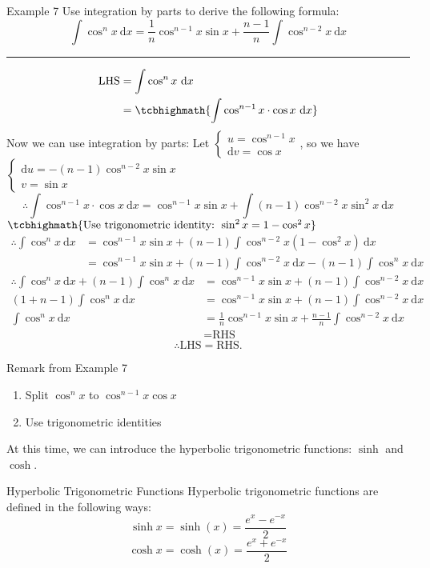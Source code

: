 \documentclass[12pt,a4paper]{article}
\def\d{{\mathrm{d}}}
\begin{document}
\begin{eg}{Example 7}
	Use integration by parts to derive the following formula: 
	$$\int\cos^nx\ \d x=\frac{1}{n}\cos^{n-1}x\sin{x}+\frac{n-1}{n}\int\cos^{n-2}x\ \d x$$
	\noindent\rule[0.25\baselineskip]{\textwidth}{1pt}
	$$\begin{aligned}
		\text{LHS}&=\int\cos^n x\ \d x\\
		&=\tcbhighmath{\int\cos^{n-1}x\cdot\cos x\ \d x}
	\end{aligned}$$
	Now we can use integration by parts: Let $\begin{cases}u=\cos^{n-1}x\\\d v=\cos x\end{cases}$, so we have $\begin{cases}\d u=-(n-1)\cos^{n-2}x\sin{x}\\v=\sin{x}\end{cases}$
	$$\therefore\int\cos^{n-1}x\cdot\cos{x}\ \d x=\cos^{n-1}x\sin{x}+\int(n-1)\cos^{n-2}x\sin^{2}x\ \d x$$
	$\tcbhighmath{\text{Use trigonometric identity: }\sin^2x=1-\cos^2x}$
	$$\begin{aligned}
		\therefore \boxed{\int\cos^n x\ \d x}&=\cos^{n-1}x\sin{x}+(n-1)\int\cos^{n-2}x(1-\cos^2x)\ \d x\\
		&=\cos^{n-1}x\sin{x}+(n-1)\int\cos^{n-2}x\ \d x-\boxed{(n-1)\int\cos^n x\ \d x}
	\end{aligned}$$
	$$\begin{aligned}
		\therefore\int\cos^n x\ \d x+(n-1)\int\cos^n x\ \d x&=\cos^{n-1}x\sin{x}+(n-1)\int\cos^{n-2}x\ \d x\\
		(1+n-1)\int\cos^n x\ \d x&=\cos^{n-1}x\sin{x}+(n-1)\int\cos^{n-2}x\ \d x\\
		\int\cos^n x\ \d x&=\frac{1}{n}\cos^{n-1}x\sin{x}+\frac{n-1}{n}\int\cos^{n-2}x\ \d x\\
		&=\text{RHS}
	\end{aligned}$$
	$$\therefore\text{LHS}=\text{RHS}.$$
	\begin{rmk}{Remark from Example 7}
		\begin{enumerate}
			\item Split $\cos^nx$ to $\cos^{n-1}x\cos{x}$
			\item Use trigonometric identities
		\end{enumerate}
	\end{rmk}
\end{eg}
At this time, we can introduce the hyperbolic trigonometric functions: $\sinh$ and $\cosh$.
\begin{df}{Hyperbolic Trigonometric Functions}
	Hyperbolic trigonometric functions are defined in the following ways: 
	$$\sinh{x}=\sinh(x)=\frac{e^x-e^{-x}}{2}$$
	$$\cosh{x}=\cosh(x)=\frac{e^x+e^{-x}}{2}$$
\end{df}
\end{document}
